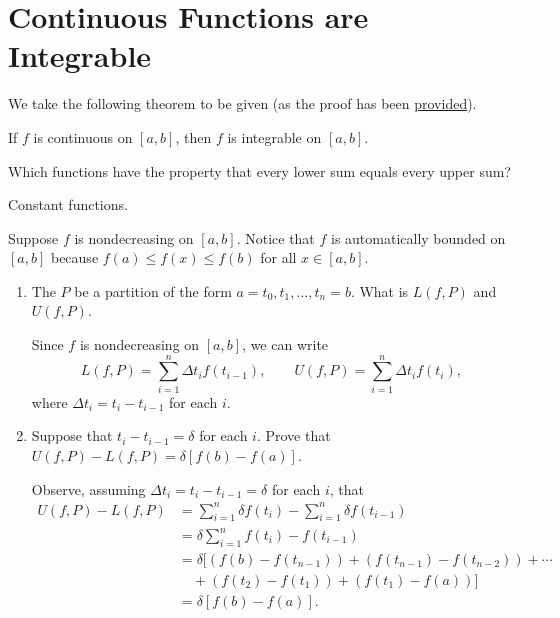 \section{Continuous Functions are Integrable}

\begin{callout}
  We take the following theorem to be given (as the proof has been
  \href{https://youtu.be/rdUaRDS9Elc}{provided}).
  \begin{theorem}
  \label{thm:continuous-functions-integrable}
    If $f$ is continuous on $[a, b]$, then $f$ is integrable on $[a, b]$.
  \end{theorem}

\end{callout}

\begin{problem}
  Which functions have the property that every lower sum equals every upper sum?
  \vspace{\baselineskip}

  Constant functions.
\end{problem}

\begin{problem}
  Suppose $f$ is nondecreasing on $[a, b]$. Notice that $f$ is automatically bounded on $[a, b]$ because
  $f(a) \leq f(x) \leq f(b)$ for all $x \in [a, b]$.
  \begin{enumerate}[label=(\alph*)]
    \item The $P$ be a partition of the form $a = t_{0}, t_{1}, \ldots, t_{n} = b$. What is $L(f, P)$ and $U(f, P)$.

      Since $f$ is nondecreasing on $[a, b]$, we can write
      \[
        L(f, P) = \sum_{i=1}^{n} \Delta t_i f(t_{i-1}),  \qquad U(f, P) = \sum_{i=1}^{n} \Delta t_i f(t_{i}),
      \]
      where $\Delta t_i = t_{i} - t_{i-1}$ for each $i$.

    \item Suppose that $t_{i} - t_{i-1} = \delta$ for each $i$. Prove that $U(f, P) - L(f, P) = \delta [f(b) - f(a)]$.

      Observe, assuming $\Delta t_i = t_{i} - t_{i-1} = \delta$ for each $i$, that
      \begin{align*}
        U(f, P) - L(f, P) &= \sum_{i=1}^{n} \delta f(t_{i}) - \sum_{i=1}^{n} \delta f(t_{i-1}) \\
                          &= \delta \sum_{i=1}^{n} f(t_{i}) - f(t_{i-1}) \\
                          &= \delta [ (f(b) - f(t_{n-1})) + (f(t_{n-1}) - f(t_{n-2})) + \cdots \\
                          &\quad + (f(t_{2}) - f(t_{1})) + (f(t_{1}) - f(a))] \\
                          &= \delta [ f(b) - f(a)].
      \end{align*}
  \end{enumerate}
\end{problem}

